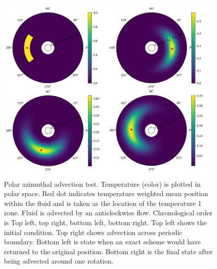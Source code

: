 \documentclass{article}
\begin{document}
\begin{figure}[h!]
	\centering
	\includegraphics{polarPeriodic/PolarPeriodicFigure.jpg}
	\caption{Polar azimuthal advection test. Temperature (color) is plotted in polar space. Red dot indicates temperature weighted mean position within 
	the fluid and is taken as the location of the temperature 1 zone. Fluid is advected by an anticlockwise flow. Chronological order is Top left, top right, bottom left, bottom right. Top left shows the initial condition. Top right shows advection across periodic boundary. Bottom left is state when an exact scheme would have returned to the original position. Bottom right is the final state after being advected around one rotation.}
	\label{polar periodic advection}
\end{figure}
\end{document}

